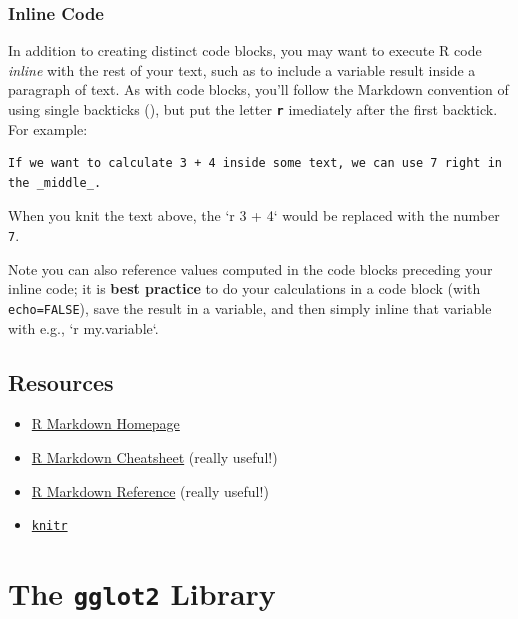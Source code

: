\documentclass[]{book}
\providecommand{\tightlist}{%
  \setlength{\itemsep}{0pt}\setlength{\parskip}{0pt}}
\theoremstyle{definition}
\theoremstyle{definition}
\theoremstyle{remark}
\begin{document}
\subsection{Inline Code}\label{inline-code}

In addition to creating distinct code blocks, you may want to execute R
code \emph{inline} with the rest of your text, such as to include a
variable result inside a paragraph of text. As with code blocks, you'll
follow the Markdown convention of using single backticks
(\textbf{\texttt{\textasciigrave{}}}), but put the letter
\textbf{\texttt{r}} imediately after the first backtick. For example:

\begin{verbatim}
If we want to calculate 3 + 4 inside some text, we can use 7 right in the _middle_.
\end{verbatim}

When you knit the text above, the `r 3 + 4` would be replaced with the
number \texttt{7}.

Note you can also reference values computed in the code blocks preceding
your inline code; it is \textbf{best practice} to do your calculations
in a code block (with \texttt{echo=FALSE}), save the result in a
variable, and then simply inline that variable with e.g., `r
my.variable`.

\section*{Resources}\label{resources-11}


\begin{itemize}
\tightlist
\item
  \href{http://rmarkdown.rstudio.com/}{R Markdown Homepage}
\item
  \href{https://www.rstudio.com/wp-content/uploads/2016/03/rmarkdown-cheatsheet-2.0.pdf}{R
  Markdown Cheatsheet} (really useful!)
\item
  \href{https://www.rstudio.com/wp-content/uploads/2015/03/rmarkdown-reference.pdf}{R
  Markdown Reference} (really useful!)
\item
  \href{https://yihui.name/knitr/}{\texttt{knitr}}
\end{itemize}

\chapter{\texorpdfstring{The \texttt{gglot2}
Library}{The gglot2 Library}}\label{ggplot2}
\end{document}
